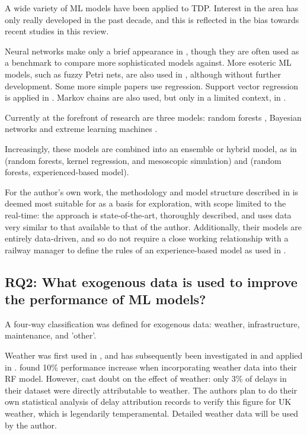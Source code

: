 \documentclass{article}
\begin{document}
A wide variety of ML models have been applied to TDP. Interest in the area has only really developed in the past decade, and this is reflected in the bias towards recent studies in this review. 

Neural networks make only a brief appearance in \cite{yaghini_et_al_2013}, though they are often used as a benchmark to compare more sophisticated models against. More esoteric ML models, such as fuzzy Petri nets, are also used in \cite{milinkovic_et_al_2013}, although without further development. Some more simple papers \cite{wang_work_2015} use regression. Support vector regression is applied in \cite{barbour_et_al_2018}\cite{markovic_et_al_2015} . Markov chains are also used, but only in a limited context, in \cite{gaurav_et_al_2018}.

Currently at the forefront of research are three models: random forests \cite{nabian_et_al_2019}\cite{nair_et_al_2019}\cite{oneto_et_al_2016}, Bayesian networks \cite{corman_kecman_2018}\cite{lessan_fu_wen_2019} and extreme learning machines \cite{oneto_et_al_2017a}\cite{oneto_et_al_2017b}. 

Increasingly, these models are combined into an ensemble or hybrid model, as in \cite{nair_et_al_2019} (random forests, kernel regression, and mesoscopic simulation) and \cite{oneto_et_al_2019} (random forests, experienced-based model).

For the author's own work, the methodology and model structure described in \cite{nair_et_al_2019} is deemed most suitable for as a basis for exploration, with scope limited to the real-time: the approach is state-of-the-art, thoroughly described, and uses data very similar to that available to that of the author. Additionally, their models are entirely data-driven, and so do not require a close working relationship with a railway manager to define the rules of an experience-based model as used in \cite{oneto_et_al_2019}.

\subsection{RQ2: What exogenous data is used to improve the performance of ML models?}

A four-way classification was defined for exogenous data: weather, infrastructure, maintenance, and 'other'. 

Weather was first used in \cite{oneto_et_al_2016}, and has subsequently been investigated in \cite{brazil_2017} and applied in \cite{nabian_et_al_2019}\cite{nair_et_al_2019}\cite{wang_et_al_2019}. \cite{oneto_et_al_2016} found 10\% performance increase when incorporating weather data into their RF model. However, \cite{nair_et_al_2019} cast doubt on the effect of weather: only 3\% of delays in their dataset were directly attributable to weather. The authors plan to do their own statistical analysis of delay attribution records to verify this figure for UK weather, which is legendarily temperamental. Detailed weather data will be used by the author.
\end{document}
